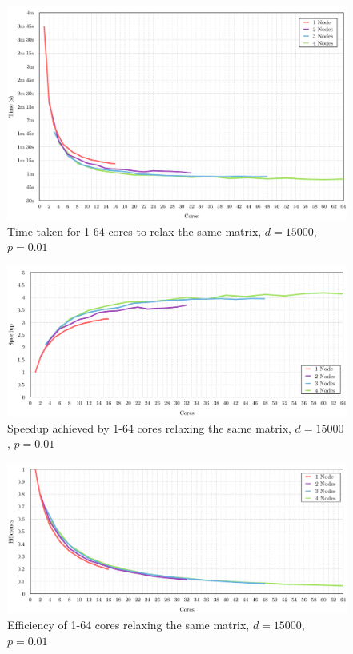 \documentclass[12pt]{article}
\begin{document}
\begin{figure}[!htbp]
        \centering\includegraphics[width=\textwidth]{img/basic-cpus-time.pdf}
        \caption{Time taken for 1-64 cores to relax the same matrix, $d=15000$, $p=0.01$}
        \label{fig:time15}
\end{figure}
\begin{figure}[!htbp]
        \centering\includegraphics[width=\textwidth]{img/15kspeedup.pdf}
        \caption{Speedup achieved by 1-64 cores relaxing the same matrix, $d=15000$, $p=0.01$}
        \label{fig:sp15}
\end{figure}
\begin{figure}[!htbp]
        \centering\includegraphics[width=\textwidth]{img/15kefficiency.pdf}
        \caption{Efficiency of 1-64 cores relaxing the same matrix, $d=15000$, $p=0.01$}
        \label{fig:eff15}
\end{figure}
\end{document}

